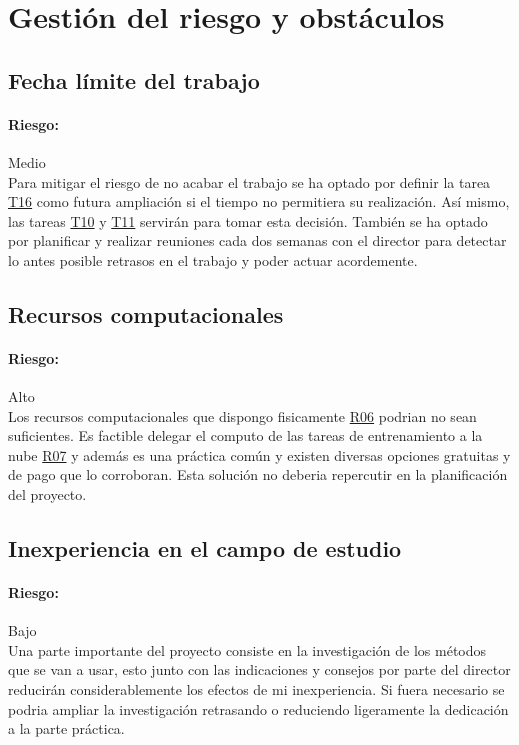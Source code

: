
\section{Gestión del riesgo y obstáculos}\label{riskmanagement}
\subsection{Fecha límite del trabajo}
\paragraph{Riesgo:} Medio\\
Para mitigar el riesgo de no acabar el trabajo se ha optado por definir la tarea \hyperref[T16]{T16} 
como futura ampliación si el tiempo no permitiera su realización. Así mismo, las tareas \hyperref[T10]{T10} y
\hyperref[T11]{T11} servirán para tomar esta decisión.
También se ha optado por planificar y realizar reuniones cada dos semanas con el director
para detectar lo antes posible retrasos en el trabajo y poder actuar acordemente.

\subsection{Recursos computacionales}
\paragraph{Riesgo:} Alto\\
Los recursos computacionales que dispongo fisicamente \hyperref[R06]{R06} podrian no sean suficientes.
Es factible delegar el computo de las tareas de entrenamiento a la nube \hyperref[R07]{R07} y además
es una práctica común y existen diversas opciones gratuitas y de pago que lo corroboran.
Esta solución no deberia repercutir en la planificación del proyecto.

\subsection{Inexperiencia en el campo de estudio}
\paragraph{Riesgo:} Bajo\\
Una parte importante del proyecto consiste en la investigación de los métodos que se van a usar, esto
junto con las indicaciones y consejos por parte del director reducirán considerablemente los efectos
de mi inexperiencia.
Si fuera necesario se podria ampliar la investigación retrasando o reduciendo ligeramente la
dedicación a la parte práctica.


